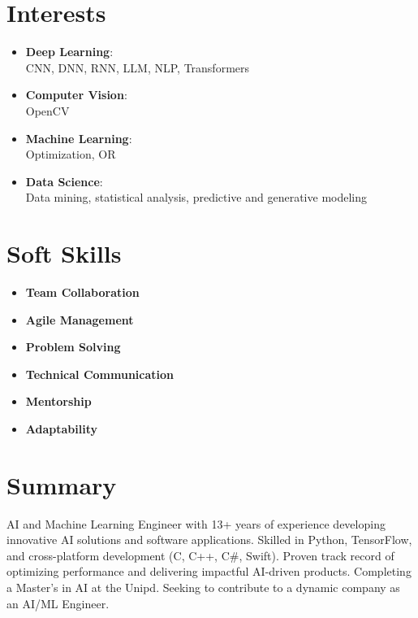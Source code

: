 \documentclass[a4paper]{article}
\begin{document}
\begin{paracol}{2}
\section*{Interests}
\begin{itemize}[left=18pt,label={}]
\setlength\itemsep{-0.05em}
    \item[\faBrain] \textbf{Deep Learning}: \\CNN, DNN, RNN, LLM, NLP, Transformers
    \item[\faEye] \textbf{Computer Vision}:\\ OpenCV
    \item[\faProjectDiagram] \textbf{Machine Learning}:\\ Optimization, OR
    \item[\faChartLine] \textbf{Data Science}:\\ Data mining, statistical analysis, predictive and generative modeling
\end{itemize}


\section*{Soft Skills}
\begin{itemize}[left=18pt,label={}]
\setlength\itemsep{-0.05em}
    \item[\faUsers] \textbf{Team Collaboration}
    \item[\faTasks] \textbf{Agile Management}
    \item[\faBug] \textbf{Problem Solving}
    \item[\faComments] \textbf{Technical Communication}
    \item[\faChalkboardTeacher] \textbf{Mentorship}
    \item[\faRocket] \textbf{Adaptability}
\end{itemize}


\switchcolumn %


\section*{Summary}
AI and Machine Learning Engineer with 13+ years of experience developing innovative AI solutions and software applications. Skilled in Python, TensorFlow, and cross-platform development (C, C++, C\#, Swift). Proven track record of optimizing performance and delivering impactful AI-driven products. Completing a Master’s in AI at the Unipd. Seeking to contribute to a dynamic company as an AI/ML Engineer.


\end{paracol}
\end{document}
